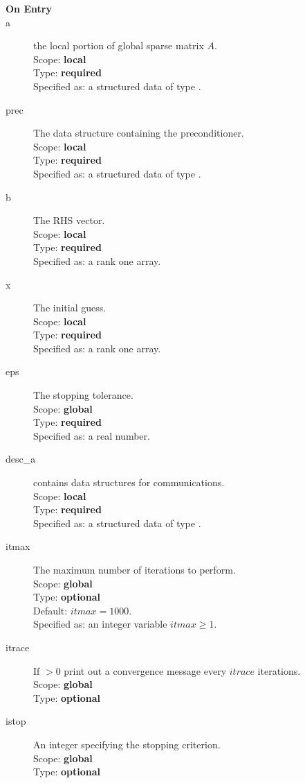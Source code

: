 \begin{description}
\item[\bf On Entry]
\item[a] the local portion of global sparse matrix
$A$. \\
Scope: {\bf local} \\
Type: {\bf required}\\
Specified as: a structured data of type \spdata.
\item[prec] The data structure containing the preconditioner.\\
Scope: {\bf local} \\
Type: {\bf required}\\
Specified as: a structured data of type \precdata.
\item[b] The RHS vector. \\
Scope: {\bf local} \\
Type: {\bf required}\\
Specified as: a rank one array.
\item[x] The initial guess. \\
Scope: {\bf local} \\
Type: {\bf required}\\
Specified as: a rank one array.
\item[eps] The stopping tolerance. \\
Scope: {\bf global} \\
Type: {\bf required}\\
Specified as: a real number. 
\item[desc\_a] contains data structures for communications.\\
Scope: {\bf local} \\
Type: {\bf required}\\
Specified as: a structured data of type \descdata.
\item[itmax]  The maximum number of iterations to perform.\\
Scope: {\bf global} \\
Type: {\bf optional}\\
Default: $itmax = 1000$.\\
Specified as: an integer variable $itmax \ge 1$.
\item[itrace]  If $>0$  print out a convergence message every $itrace$ iterations.\\
Scope: {\bf global} \\
Type: {\bf optional}\\
\item[istop]  An integer specifying the stopping criterion.\\
Scope: {\bf global} \\
Type: {\bf optional}\\


\end{description}
